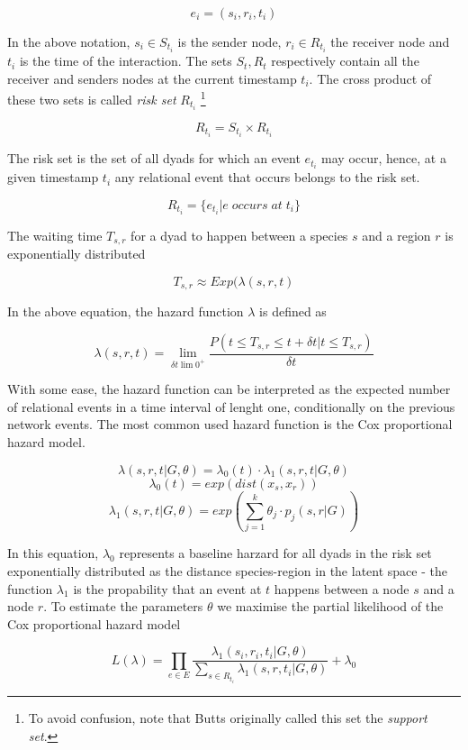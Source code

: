 \documentclass[mscthesis]{usiinfthesis}
\begin{document}
\[
e_i = (s_i, r_i, t_i)
\]

In the above notation, $s_i \in S_{t_i} $ is the sender node, $r_i \in R_{t_i}$ the receiver node and $t_i$ is the time of the interaction. The sets $S_t, R_t$ respectively contain all the receiver and senders nodes at the current timestamp $t_i$. The cross product of these two sets is called \textit{risk set} $R_{t_i}$  \footnote{\label{riskset_footnote}To avoid confusion, note that Butts originally called this set the \textit{support set}.}



\[
R_{t_i} = S_{t_i} \times R_{t_i}
\]

The risk set is the set of all dyads for which an event $e_{t_i}$ may occur, hence, at a given timestamp $t_i$ any relational event that occurs belongs to the risk set.

\[
R_{t_i} = \{e_{t_i} | e \; occurs \; at \; t_i\}
\]

The waiting time $T_{s,r}$ for a dyad to happen between a species $s$ and a region $r$ is exponentially distributed 

\[
T_{s,r} \approx Exp(\lambda(s, r, t)
\]


In the above equation, the hazard function $\lambda$ is defined as

\[
\lambda(s, r, t) = \lim_{\delta t \lim 0^+} \frac{P(t \leq T_{s,r} \leq t + \delta t | t \leq T_{s,r})}{\delta t}
\]

With some ease, the hazard function can be interpreted as the expected number of relational events in a time interval of lenght one, conditionally on the previous network events. The most common used hazard function is the Cox proportional hazard model. 


\[
\lambda(s, r, t|G, \theta) = \lambda_0(t) \cdot \lambda_1(s, r, t|G, \theta)
\]
\[
\lambda_0(t) =  exp \left(dist(x_s, x_r) \right)
\]
\[
\lambda_1(s, r, t|G, \theta) = exp \left(\sum_{j=1}^k \theta_j \cdot p_j(s, r|G) \right)
\]

In this equation, $\lambda_0$ represents a baseline harzard for all dyads in the risk set exponentially distributed as the distance species-region in the latent space - the function $\lambda_1$ is the propability that an event at $t$ happens between a node $s$ and a node $r$. To estimate the parameters $\theta$ we maximise the partial likelihood of the Cox proportional hazard model 

\[
L(\lambda) =  \prod_{e \in E} \frac{\lambda_1(s_i, r_i, t_i | G, \theta)}{ \sum_{s \in R_{t_i}} \lambda_1(s, r, t_i | G, \theta)} + \lambda_0
\]
\end{document}
